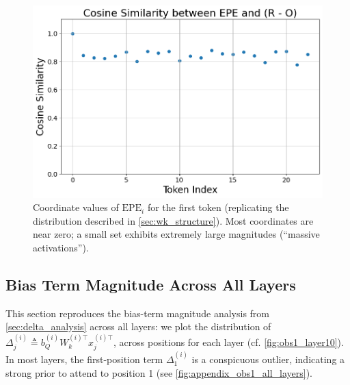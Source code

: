 \documentclass[11pt]{article}
\begin{document}
\begin{figure}[t]
  \includegraphics[width=\columnwidth]{figures/epe_exp.png}
  \caption{Coordinate values of $\mathrm{EPE}_i$ for the first token (replicating the distribution described in \cref{sec:wk_structure}). Most coordinates are near zero; a small set exhibits extremely large magnitudes (``massive activations'').}
  \label{fig:epe_exp}
\end{figure}

\subsection{Bias Term Magnitude Across All Layers}\label{app:bias_term}

This section reproduces the bias-term magnitude analysis from \cref{sec:delta_analysis} across all layers: we plot the distribution of $\Delta_j^{(i)} \triangleq b_Q^{(i)}W_k^{(i)\top} x_j^{(i)\top}$, across positions for each layer (cf. \cref{fig:obs1_layer10}). In most layers, the first-position term $\Delta_1^{(i)}$ is a conspicuous outlier, indicating a strong prior to attend to position 1 (see \cref{fig:appendix_obs1_all_layers}).
\end{document}
